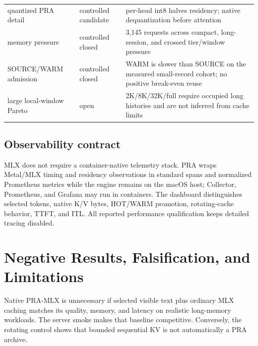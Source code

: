\documentclass[10pt]{article}
\begin{document}
\begin{center}
\begin{tabularx}{0.96\linewidth}{l l Y}
quantized PRA detail & controlled candidate & per-head int8 halves residency; native dequantization before attention \\
memory pressure & controlled closed & 3,145 requests across compact, long-session, and crossed tier/window pressure \\
SOURCE/WARM admission & controlled closed & WARM is slower than SOURCE on the measured small-record cohort; no positive break-even reuse \\
large local-window Pareto & open & 2K/8K/32K/full require occupied long histories and are not inferred from cache limits \\
\bottomrule
\end{tabularx}
\end{center}

\subsection{Observability contract}

MLX does not require a container-native telemetry stack.  PRA wraps Metal/MLX
timing and residency observations in standard spans and normalized Prometheus
metrics while the engine remains on the macOS host; Collector, Prometheus, and
Grafana may run in containers.  The dashboard distinguishes selected tokens,
native K/V bytes, HOT/WARM promotion, rotating-cache behavior, TTFT, and ITL.
All reported performance qualification keeps detailed tracing disabled.

\section{Negative Results, Falsification, and Limitations}
Native PRA-MLX is unnecessary if selected visible text plus ordinary MLX
caching matches its quality, memory, and latency on realistic long-memory
workloads. The server smoke makes that baseline competitive. Conversely, the
rotating control shows that bounded sequential KV is not automatically a PRA
archive.
\end{document}
